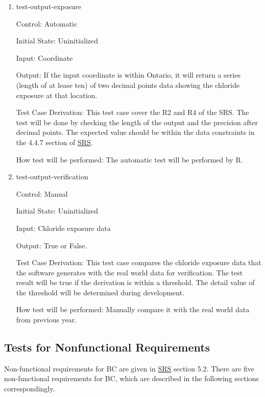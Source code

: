 \documentclass[12pt, titlepage]{article}
\begin{document}
\begin{enumerate}

\item{test-output-exposure\\}

Control: Automatic
					
Initial State: Uninitialized
					
Input: Coordinate
					
Output: If the input coordinate is within Ontario, it will return a series (length of at lease ten) of two decimal points data showing the chloride exposure at that location.

Test Case Derivation: This test case cover the R2 and R4 of the SRS. The test will be done by checking the length of the output and the precision after decimal points. The expected value should be within the data constraints in the 4.4.7 section of \href{https://github.com/CynthiaLiu0805/BridgeCorrosion/blob/main/docs/SRS/SRS.pdf}{SRS}.

					
How test will be performed: The automatic test will be performed by R.


\item{test-output-verification\\}

Control: Manual
					
Initial State: Uninitialized
					
Input: Chloride exposure data
					
Output: True or False.

Test Case Derivation: This test case compares the chloride exposure data that the software generates with the real world data for verification. The test result will be true if the derivation is within a threshold. The detail value of the threshold will be determined during development.

					
How test will be performed: Manually compare it with the real world data from previous year. 
\end{enumerate}


\subsection{Tests for Nonfunctional Requirements}

Non-functional requirements for BC are given in \href{https://github.com/CynthiaLiu0805/BridgeCorrosion/blob/main/docs/SRS/SRS.pdf}{SRS} section 5.2. There are five non-functional requirements for BC, which are described in the following sections correspondingly.
\end{document}
